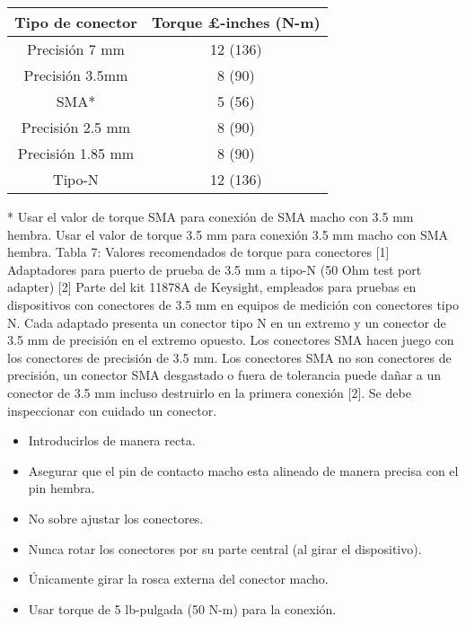 \begin{table}[h!]
	\centering
	\begin{tabular}{cc}
		\toprule
		{\bfseries Tipo de conector} 		& {\bfseries Torque \si{\pounds}-inches (\si{\newton}-\si{\meter})} 	\\
		\midrule
		Precisión 7 \si{\milli\meter} 		& 	12 (136) 		\\
		Precisión 3.5\si{\milli\meter}		& 	8 (90)			\\
		SMA*								& 	5 (56)			\\
		Precisión 2.5 \si{\milli\meter}		& 	8 (90)			\\
		Precisión 1.85 \si{\milli\meter}	& 	8 (90)			\\
		Tipo-N								&	12 (136)		\\		
		\bottomrule
	\end{tabular}
\end{table}

* Usar el valor de torque SMA para conexión de SMA macho con 3.5 mm hembra. Usar el valor de torque 3.5 mm para conexión 3.5 mm macho con SMA hembra.
Tabla 7: Valores recomendados de torque para conectores [1]
Adaptadores para puerto de prueba de 3.5 mm a tipo-N (50 Ohm test port adapter) [2]
Parte del kit 11878A de Keysight, empleados para pruebas en dispositivos con conectores de 3.5 mm en equipos de medición con conectores tipo N. Cada adaptado presenta un conector tipo N en un extremo y un conector de 3.5 mm de precisión en el extremo opuesto.
Los conectores SMA hacen juego con los conectores de precisión de 3.5 mm. Los conectores SMA no son conectores de precisión, un conector SMA desgastado o fuera de tolerancia puede dañar a un conector de 3.5 mm incluso destruirlo en la primera conexión [2]. Se debe inspeccionar con cuidado un conector.

\begin{itemize}
	\item Introducirlos de manera recta.
	\item Asegurar que el pin de contacto macho esta alineado de manera precisa con el pin hembra.
	\item No sobre ajustar los conectores.
	\item Nunca rotar los conectores por su parte central (al girar el dispositivo).
	\item Únicamente girar la rosca externa del conector macho.
	\item Usar torque de 5 lb-pulgada (50 \si{\newton}-\si{\meter}) para la conexión.

\end{itemize}


